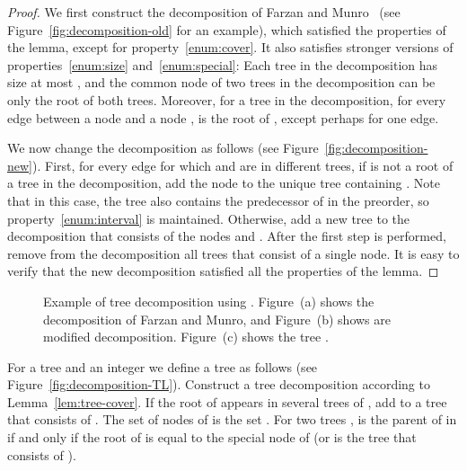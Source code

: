 \documentclass[12pt]{article}
\begin{document}
\begin{proof}
We first construct the decomposition of Farzan and Munro~\cite{FarzanM08}
(see Figure~\ref{fig:decomposition-old} for an example), which
satisfied the properties of the lemma, except for property~\ref{enum:cover}.
It also satisfies stronger versions of properties~\ref{enum:size}
and~\ref{enum:special}: Each tree in the decomposition has size at most ,
and the common node of two trees in the decomposition can be only the root of
both trees.
Moreover, for a tree  in the decomposition,
for every edge  between a node  and a node ,
 is the root of , except perhaps for one edge.

We now change the decomposition as follows
(see Figure~\ref{fig:decomposition-new}).
First, for every edge  for which  and  are in different trees,
if  is not a root of a tree in the decomposition,
add the node  to the unique tree containing .
Note that in this case, the tree also contains the predecessor of  in the
preorder, so property~\ref{enum:interval} is maintained.
Otherwise, add a new tree to the decomposition that consists of the nodes
 and .
After the first step is performed, remove from the decomposition
all trees that consist of a single node.
It is easy to verify that the new decomposition satisfied all the properties
of the lemma.
\end{proof}
\begin{figure}
\centering
\hfill
{}
\hfill
{}
\hfill
{}
\hfill\hspace*{0pt}
\caption{Example of tree decomposition using .
Figure~(a) shows the decomposition of Farzan and Munro,
and Figure~(b) shows are modified decomposition.
Figure~(c) shows the tree .
}
\end{figure}

For a tree  and an integer  we define a tree  as follows
(see Figure~\ref{fig:decomposition-TL}).
Construct a tree decomposition  according to
Lemma~\ref{lem:tree-cover}.
If the root  of  appears in several trees of ,
add to  a tree that consists of .
The set of nodes of  is the set .
For two trees ,  is the parent of  in 
if and only if the root of  is equal to the special node of 
(or  is the tree that consists of ).
\end{document}
